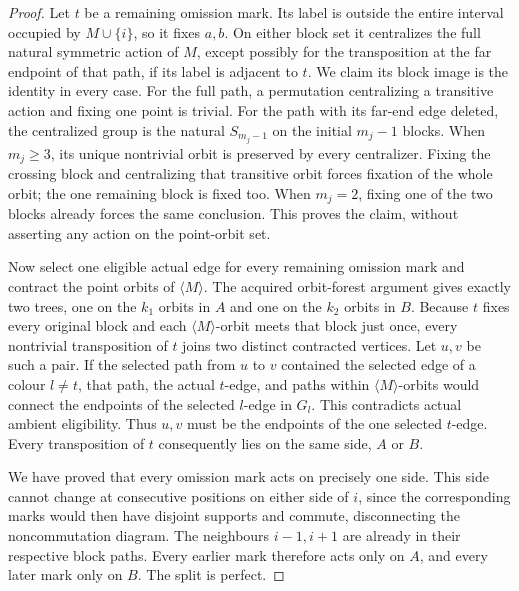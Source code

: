 \documentclass[11pt,a4paper]{article}
\newcommand{\gen}[1]{\langle#1\rangle}
\begin{document}
\begin{proof}
Let $t$ be a remaining omission mark. Its label is outside
the entire interval occupied by $M\cup\{i\}$, so it fixes
$a,b$. On either block set it centralizes the full natural
symmetric action of $M$, except possibly for the transposition
at the far endpoint of that path, if its label is adjacent
to $t$. We claim its block image is the identity in every case.
For the full path, a permutation centralizing a transitive
action and fixing one point is trivial. For the path with its
far-end edge deleted, the centralized group is the natural
$S_{m_j-1}$ on the initial $m_j-1$ blocks. When $m_j\ge3$,
its unique nontrivial orbit is preserved by every centralizer.
Fixing the crossing block and centralizing that transitive
orbit forces fixation of the whole orbit; the one remaining
block is fixed too. When $m_j=2$, fixing one of the two
blocks already forces the same conclusion. This proves the
claim, without asserting any action on the point-orbit set.

Now select one eligible actual edge for every remaining
omission mark and contract the point orbits of $\gen M$.
The acquired orbit-forest argument gives exactly two trees,
one on the $k_1$ orbits in $A$ and one on the $k_2$ orbits
in $B$. Because $t$ fixes every original block and each
$\gen M$-orbit meets that block just once, every nontrivial
transposition of $t$ joins two distinct contracted vertices.
Let $u,v$ be such a pair. If the selected path from $u$ to
$v$ contained the selected edge of a colour $l\ne t$, that
path, the actual $t$-edge, and paths within $\gen M$-orbits
would connect the endpoints of the selected $l$-edge in
$G_l$. This contradicts actual ambient eligibility. Thus
$u,v$ must be the endpoints of the one selected $t$-edge.
Every transposition of $t$ consequently lies on the same
side, $A$ or $B$.

We have proved that every omission mark acts on precisely
one side. This side cannot change at consecutive positions
on either side of $i$, since the corresponding marks would
then have disjoint supports and commute, disconnecting the
noncommutation diagram. The neighbours $i-1,i+1$ are already
in their respective block paths. Every earlier mark therefore
acts only on $A$, and every later mark only on $B$.
The split is perfect.
\end{proof}
\end{document}
